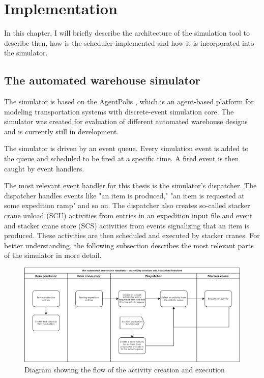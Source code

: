 \documentclass{ctuthesis}
\begin{document}
\chapter{Implementation}

 In this chapter, I will briefly describe the architecture of the simulation tool to describe then, how is the scheduler implemented and how it is incorporated into the simulator.

\section{The automated warehouse simulator}

 The simulator is based on the AgentPolis \cite{agentpolis}, which is an agent-based platform for modeling transportation systems with discrete-event simulation core. The simulator was created for evaluation of different automated warehouse designs and is currently still in development.
 
 The simulator is driven by an event queue. Every simulation event is added to the queue and scheduled to be fired at a specific time. A fired event is then caught by event handlers. 
 
 The most relevant event handler for this thesis is the simulator's dispatcher. The dispatcher handles events like "an item is produced," "an item is requested at some expedition ramp" and so on. The dispatcher also creates so-called stacker crane unload (SCU) activities from entries in an expedition input file and event and stacker crane store (SCS) activities from events signalizing that an item is produced. These activities are then scheduled and executed by stacker cranes. For better understanding, the following subsection describes the most relevant parts of the simulator in more detail.
 
\begin{figure}[H]
\includegraphics[width=1\linewidth]{flowchart2.png}
\caption{Diagram showing the flow of the activity creation and execution}
\label{flowchart1}
\end{figure}
\end{document}
